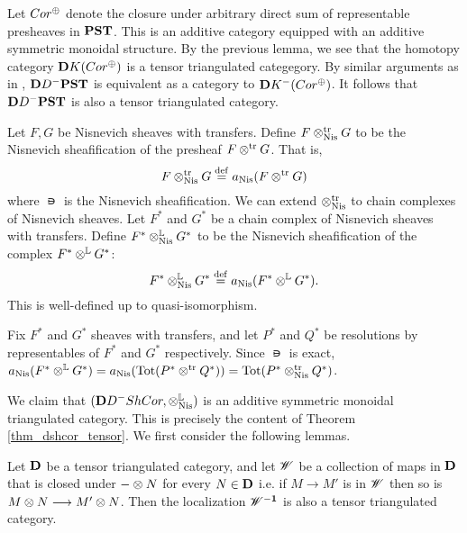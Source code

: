 Let $\Cor^{\oplus}$ denote the closure under arbitrary direct 
sum of representable presheaves in $\PST$. This is an additive
category equipped with an additive symmetric monoidal structure.
By the previous lemma, we see that the homotopy category 
$\DCat{K}(\Cor^{\oplus})$ is a tensor triangulated categegory.
By similar arguments as in \cite[10.4.8]{WH}, $\DCat{D}^-\PST$
is equivalent as a category to $\DCat{K}^-(\Cor^{\oplus})$.
It follows that $\DCat{D}^-\PST$ is also a tensor triangulated 
category.

\begin{defn}\label{def_shcor_tensor}
Let $F, G$ be Nisnevich sheaves with transfers. Define
$F \ttrNis G$ to be the Nisnevich sheafification of the presheaf
$F \ttr G$. That is,
\[
F \ttrNis G \defeq \nis(F \ttr G)
\]
where $\nis$ is the Nisnevich sheafification. We can extend 
$\ttrNis$ to chain complexes of Nisnevich sheaves. Let $F^*$ and 
$G^*$ be a chain complex of Nisnevich sheaves with transfers. 
Define $F^* \tLNis G^*$ to be the Nisnevich sheafification of the 
complex $F^* \tL G^*$:
\[
F^* \tLNis G^* \defeq \nis(F^* \tL G^*).
\]
This is well-defined up to quasi-isomorphism.
\end{defn}

\begin{rmk}
Fix $F^*$ and $G^*$ sheaves with transfers, and let $P^*$ and 
$Q^*$ be resolutions by representables of $F^*$ and $G^*$ 
respectively. Since $\nis$ is exact, $\nis(F^* \tL G^*) = 
\nis(\Tot(P^* \ttr Q^*)) = \Tot(P^* \ttrNis Q^*)$.
\end{rmk}

We claim that $(\DCat{D}^-\ShCor, \tLNis)$ is an additive 
symmetric monoidal triangulated category. This is precisely the
content of Theorem \ref{thm_dshcor_tensor}. We first consider the 
following lemmas.

\begin{lem}
Let $\DCat$ be a tensor triangulated category, and let $\Cat{W}$
be a collection of maps in $\DCat$ that is closed under $-\tensor N$
for every $N \in \DCat$ i.e. if $M \to M'$ is in $\Cat{W}$ then so is
$M \tensor N \to M' \tensor N$. Then the localization 
$\DCat[\Cat{W}^{-1}]$ is also a tensor triangulated category.
\end{lem}



\begin{thm}\label{thm_dshcor_tensor}
\end{thm}

